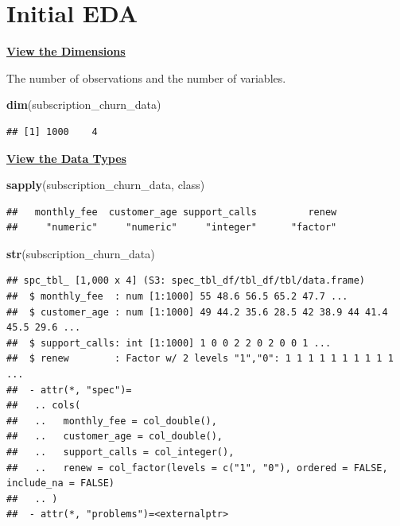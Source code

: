 \documentclass[
]{article}
\newenvironment{Shaded}{\begin{snugshade}}{\end{snugshade}}
\newcommand{\FunctionTok}[1]{\textcolor[rgb]{0.13,0.29,0.53}{\textbf{#1}}}
\newcommand{\NormalTok}[1]{#1}
\begin{document}
\section{Initial EDA}\label{initial-eda}

\ul{\textbf{View the Dimensions}}

The number of observations and the number of variables.

\begin{Shaded}
\begin{Highlighting}[]
\FunctionTok{dim}\NormalTok{(subscription\_churn\_data)}
\end{Highlighting}
\end{Shaded}

\begin{verbatim}
## [1] 1000    4
\end{verbatim}

\ul{\textbf{View the Data Types}}

\begin{Shaded}
\begin{Highlighting}[]
\FunctionTok{sapply}\NormalTok{(subscription\_churn\_data, class)}
\end{Highlighting}
\end{Shaded}

\begin{verbatim}
##   monthly_fee  customer_age support_calls         renew 
##     "numeric"     "numeric"     "integer"      "factor"
\end{verbatim}

\begin{Shaded}
\begin{Highlighting}[]
\FunctionTok{str}\NormalTok{(subscription\_churn\_data)}
\end{Highlighting}
\end{Shaded}

\begin{verbatim}
## spc_tbl_ [1,000 x 4] (S3: spec_tbl_df/tbl_df/tbl/data.frame)
##  $ monthly_fee  : num [1:1000] 55 48.6 56.5 65.2 47.7 ...
##  $ customer_age : num [1:1000] 49 44.2 35.6 28.5 42 38.9 44 41.4 45.5 29.6 ...
##  $ support_calls: int [1:1000] 1 0 0 2 2 0 2 0 0 1 ...
##  $ renew        : Factor w/ 2 levels "1","0": 1 1 1 1 1 1 1 1 1 1 ...
##  - attr(*, "spec")=
##   .. cols(
##   ..   monthly_fee = col_double(),
##   ..   customer_age = col_double(),
##   ..   support_calls = col_integer(),
##   ..   renew = col_factor(levels = c("1", "0"), ordered = FALSE, include_na = FALSE)
##   .. )
##  - attr(*, "problems")=<externalptr>
\end{verbatim}
\end{document}
